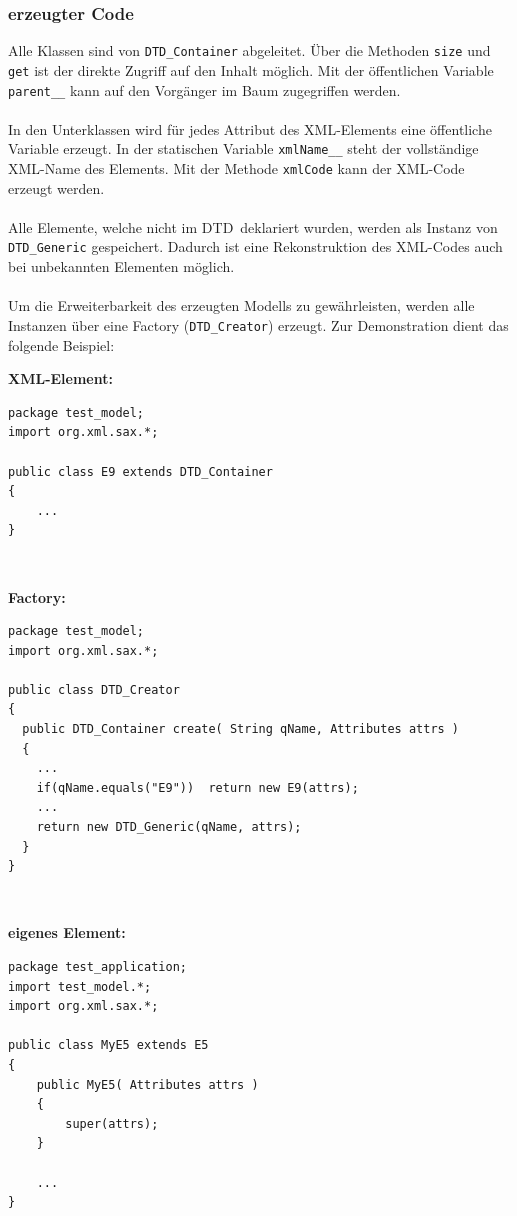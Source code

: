 \documentclass [a4paper,12pt] {scrartcl}
\newcommand{\DTD}{{\sffamily\small DTD}}
\newcommand{\XML}{{\sffamily\small XML}}
\begin{document}
\subsubsection{erzeugter Code}
Alle Klassen sind von \texttt{DTD\_Container} abgeleitet. {\"U}ber die Methoden \texttt{size}
und \texttt{get} ist der direkte Zugriff auf den Inhalt m{\"o}glich. Mit der {\"o}ffentlichen
Variable \texttt{parent\_\_} kann auf den Vorg{\"a}nger im Baum zugegriffen werden.\\
~\\
In den Unterklassen wird f{\"u}r jedes Attribut des \XML-Elements eine {\"o}ffentliche Variable
erzeugt. In der statischen Variable \texttt{xmlName\_\_} steht der vollst{\"a}ndige \XML-Name
des Elements. Mit der Methode \texttt{xmlCode} kann der \XML-Code erzeugt werden.\\
~\\
Alle Elemente, welche nicht im \DTD\ deklariert wurden, werden als Instanz von
\texttt{DTD\_Generic} gespeichert. Dadurch ist eine Rekonstruktion des \XML-Codes
auch bei unbekannten Elementen m{\"o}glich.\\
~\\
Um die Erweiterbarkeit des erzeugten Modells zu gew{\"a}hrleisten, werden alle Instanzen
{\"u}ber eine Factory (\texttt{DTD\_Creator}) erzeugt. Zur Demonstration dient das folgende Beispiel:
~\\[4ex]
\begin{minipage}{\linewidth}
\textbf{XML-Element:}
\begin{verbatim}
package test_model;
import org.xml.sax.*;

public class E9 extends DTD_Container
{
    ...
}
\end{verbatim}
\end{minipage}
~\\[4ex]
\begin{minipage}{\linewidth}
\textbf{Factory:}
\begin{verbatim}
package test_model;
import org.xml.sax.*;

public class DTD_Creator
{
  public DTD_Container create( String qName, Attributes attrs )
  {
    ...
    if(qName.equals("E9"))  return new E9(attrs);
    ...
    return new DTD_Generic(qName, attrs);
  }
}
\end{verbatim}
\end{minipage}
~\\[4ex]
\begin{minipage}{\linewidth}
\textbf{eigenes Element:}
\begin{verbatim}
package test_application;
import test_model.*;
import org.xml.sax.*;

public class MyE5 extends E5
{
    public MyE5( Attributes attrs )
    {
        super(attrs);
    }

    ...
}
\end{verbatim}
\end{minipage}
\end{document}
